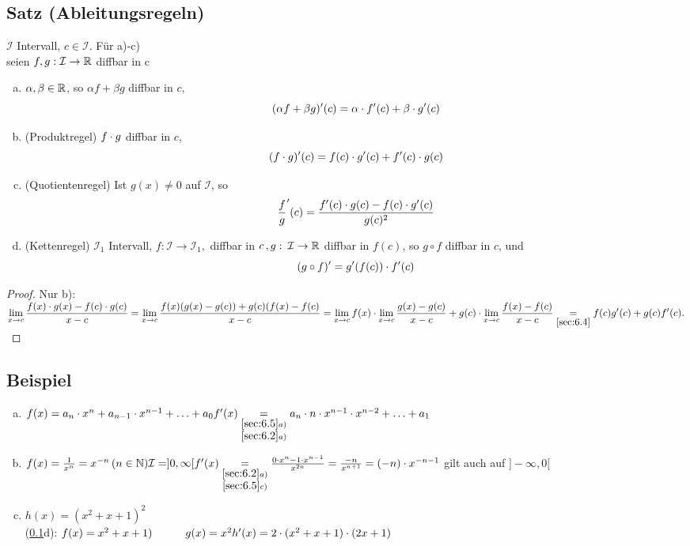 \subsection{Satz (Ableitungsregeln)}\label{sec:6.5}
$\mathcal{I}$ Intervall, $c \in \mathcal{I}$. Für a)-c)\\
seien $f,g : \mathcal{I} \to \mathbb{R} $ diffbar in c\\
\begin{enumerate}[a)]
\item $\alpha, \beta \in \mathbb{R}$, so $\alpha f + \beta g $ diffbar in $c$,
 $$(\alpha f + \beta g)'(c) = \alpha \cdot f'(c) + \beta \cdot g'(c)$$
\item (Produktregel) $f \cdot g$ diffbar in $c$,\\
$$(f \cdot g)'(c) = f(c) \cdot g'(c) + f'(c) \cdot g(c)$$
\item (Quotientenregel) Ist $g (x) \neq 0$ auf $\mathcal{I}$, so $$\frac{f}{g}'(c) = \frac{f'(c) \cdot g(c) - f(c) \cdot g'(c)}{g(c)^2}$$
\item (Kettenregel)
$\mathcal{I}_1$ Intervall, $f: \mathcal{I} \to \mathcal{I}_1,$ diffbar in $c\, ,g:\: \mathcal{I} \to \mathbb{R}$ diffbar in $f(c)$, so $g \circ f$ diffbar in $c$, und \\
\[(g \circ f)' = g'(f(c)) \cdot f'(c) \]
\end{enumerate}
\begin{proof}
Nur b):\\
$\displaystyle \lim_{x \to c} \frac{f(x) \cdot g(x) - f(c) \cdot g(c)}{x-c} = \displaystyle \lim_{x \to c} \frac{f(x)(g(x) -g(c)) + g(c)(f(x) -f(c)}{x-c} = \displaystyle \lim_{x \to c}f(x) \cdot \displaystyle \lim_{x \to c} \frac{g(x) -g(c)}{x-c} + g(c) \cdot \displaystyle \lim_{x \to c} \frac{f(x) -f(c)}{x-c} \underset{\ref{sec:6.4}}{=}f(c) g'(c) + g(c) f'(c).$\\
\end{proof}
\subsection{Beispiel}
\begin{enumerate}[a)]
\item $f(x) = a_n \cdot x^n + a_{n-1} \cdot x^{n-1} + \ldots + a_0\\
f'(x) \underset{\substack{\ref{sec:6.5}a)\\
\ref{sec:6.2}a)}}{=} a_n \cdot n \cdot x^{n-1} \cdot x^{n-2} + \ldots + a_1$
\item $f(x) = \frac{1}{x^n} = x^{-n} \, (n \in \mathbb{N})\\
\mathcal{I} = ]0,\infty[\\
f'(x) \underset{\substack{\ref{sec:6.2}a)\\
\ref{sec:6.5}c)}}{=} \frac{0 \cdot x^n - 1 \cdot x^{n-1}}{x^{2n}} = \frac{-n}{x^{n+1}} = (-n) \cdot x^{-n-1}$ gilt auch auf $]-\infty,0[$
\item $h(x) = (x^2 + x + 1)^2$\\
(\ref{sec:6.5}d): $f(x) = x^2 + x + 1)\\
\hspace*{1.05cm}g(x)= x^2\\
h'(x) = 2 \cdot (x^2 + x + 1) \cdot (2x + 1)$
\end{enumerate}
